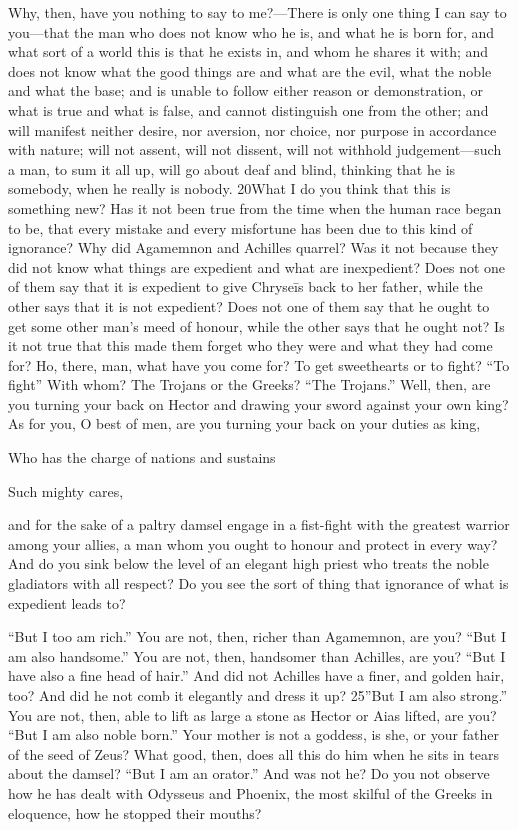 Why, then, have you nothing to say to me?—There is only one thing I can say to you—that the man who does not know who he is, and what he is born for, and what sort of a world this is that he exists in, and whom he shares it with; and does not know what the good things are and what are the evil, what the noble and what the base; and is unable to follow either reason or demonstration, or what is true and what is false, and cannot distinguish one from the other; and will manifest neither desire, nor aversion, nor choice, nor purpose in accordance with nature; will not assent, will not dissent, will not withhold judgement—such a man, to sum it all up, will go about deaf and blind, thinking that he is somebody, when he really is nobody. 20What I do you think that this is something new? Has it not been true from the time when the human race began to be, that every mistake and every misfortune has been due to this kind of ignorance? Why did Agamemnon and Achilles quarrel? Was it not because they did not know what things are expedient and what are inexpedient? Does not one of them say that it is expedient to give Chryseīs back to her father, while the other says that it is not expedient? Does not one of them say that he ought to get some other man's meed of honour, while the other says that he ought not? Is it not true that this made them forget who they were and what they had come for? Ho, there, man, what have you come for? To get sweethearts or to fight? ``To fight'' With whom? The Trojans or the Greeks? ``The Trojans.'' Well, then, are you turning your back on Hector and drawing your sword against your own king? As for you, O best of men, are you turning your back on your duties as king,

Who has the charge of nations and sustains

Such mighty cares,

and for the sake of a paltry damsel engage in a fist-fight with the greatest warrior among your allies, a man whom you ought to honour and protect in every way? And do you sink below the level of an elegant high priest who treats the noble gladiators with all respect? Do you see the sort of thing that ignorance of what is expedient leads to?

``But I too am rich.'' You are not, then, richer than Agamemnon, are you? ``But I am also handsome.'' You are not, then, handsomer than Achilles, are you? ``But I have also a fine head of hair.'' And did not Achilles have a finer, and golden hair, too? And did he not comb it elegantly and dress it up? 25''But I am also strong.'' You are not, then, able to lift as large a stone as Hector or Aias lifted, are you? ``But I am also noble born.'' Your mother is not a goddess, is she, or your father of the seed of Zeus? What good, then, does all this do him when he sits in tears about the damsel? ``But I am an orator.'' And was not he? Do you not observe how he has dealt with Odysseus and Phoenix, the most skilful of the Greeks in eloquence, how he stopped their mouths?


